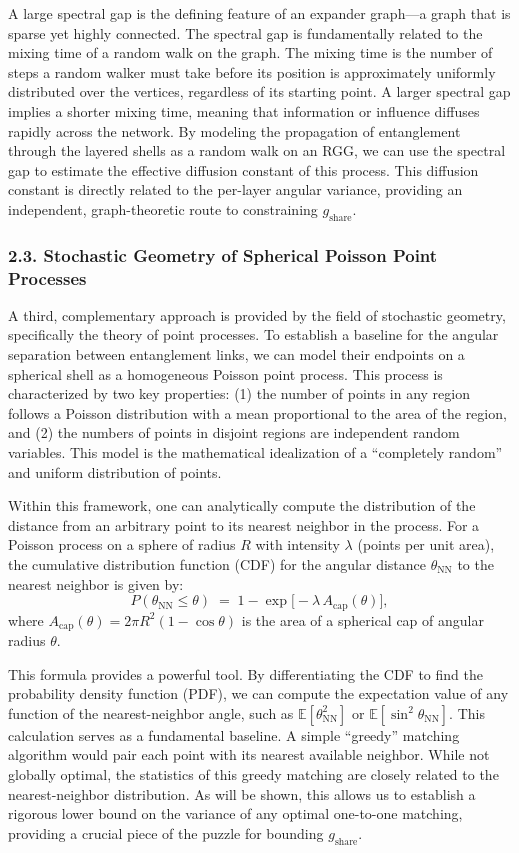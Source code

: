 \documentclass[11pt]{article}
\begin{document}
A large spectral gap is the defining feature of an expander graph—a graph that is sparse yet highly connected. The spectral gap is fundamentally related to the mixing time of a random walk on the graph. The mixing time is the number of steps a random walker must take before its position is approximately uniformly distributed over the vertices, regardless of its starting point. A larger spectral gap implies a shorter mixing time, meaning that information or influence diffuses rapidly across the network. By modeling the propagation of entanglement through the layered shells as a random walk on an RGG, we can use the spectral gap to estimate the effective diffusion constant of this process. This diffusion constant is directly related to the per-layer angular variance, providing an independent, graph-theoretic route to constraining $g_{\mathrm{share}}$.

\subsubsection*{2.3. Stochastic Geometry of Spherical Poisson Point Processes}
A third, complementary approach is provided by the field of stochastic geometry, specifically the theory of point processes. To establish a baseline for the angular separation between entanglement links, we can model their endpoints on a spherical shell as a homogeneous Poisson point process. This process is characterized by two key properties: (1) the number of points in any region follows a Poisson distribution with a mean proportional to the area of the region, and (2) the numbers of points in disjoint regions are independent random variables. This model is the mathematical idealization of a “completely random” and uniform distribution of points.

Within this framework, one can analytically compute the distribution of the distance from an arbitrary point to its nearest neighbor in the process. For a Poisson process on a sphere of radius $R$ with intensity $\lambda$ (points per unit area), the cumulative distribution function (CDF) for the angular distance $\theta_{\mathrm{NN}}$ to the nearest neighbor is given by:
\[
P(\theta_{\mathrm{NN}} \le \theta) \;=\; 1 - \exp\!\big[-\lambda\,A_{\text{cap}}(\theta)\big],
\]
where $A_{\text{cap}}(\theta) = 2\pi R^2(1-\cos\theta)$ is the area of a spherical cap of angular radius $\theta$.

This formula provides a powerful tool. By differentiating the CDF to find the probability density function (PDF), we can compute the expectation value of any function of the nearest-neighbor angle, such as $\mathbb{E}[\theta_{\mathrm{NN}}^2]$ or $\mathbb{E}[\sin^2\theta_{\mathrm{NN}}]$. This calculation serves as a fundamental baseline. A simple “greedy” matching algorithm would pair each point with its nearest available neighbor. While not globally optimal, the statistics of this greedy matching are closely related to the nearest-neighbor distribution. As will be shown, this allows us to establish a rigorous lower bound on the variance of any optimal one-to-one matching, providing a crucial piece of the puzzle for bounding $g_{\mathrm{share}}$.
\end{document}

